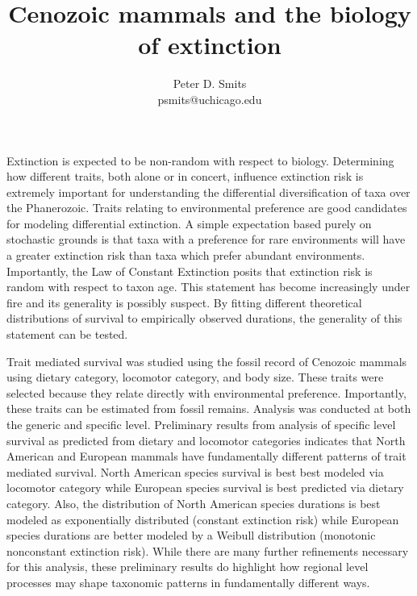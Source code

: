 \documentclass{article}
\title{Cenozoic mammals and the biology of extinction}
\author{Peter D. Smits\\ psmits@uchicago.edu}
\begin{document}
\maketitle

Extinction is expected to be non-random with respect to biology. Determining how different traits, both alone or in concert, influence extinction risk is extremely important for understanding the differential diversification of taxa over the Phanerozoic. Traits relating to environmental preference are good candidates for modeling differential extinction. A simple expectation based purely on stochastic grounds is that taxa with a preference for rare environments will have a greater extinction risk than taxa which prefer abundant environments. Importantly, the Law of Constant Extinction posits that extinction risk is random with respect to taxon age. This statement has become increasingly under fire and its generality is possibly suspect. By fitting different theoretical distributions of survival to empirically observed durations, the generality of this statement can be tested. 

Trait mediated survival was studied using the fossil record of Cenozoic mammals using dietary category, locomotor category, and body size. These traits were selected because they relate directly with environmental preference. Importantly, these traits can be estimated from fossil remains. Analysis was conducted at both the generic and specific level. Preliminary results from analysis of specific level survival as predicted from dietary and locomotor categories indicates that North American and European mammals have fundamentally different patterns of trait mediated survival. North American species survival is best best modeled via locomotor category while European species survival is best predicted via dietary category. Also, the distribution of North American species durations is best modeled as exponentially distributed (constant extinction risk) while European species durations are better modeled by a Weibull distribution (monotonic nonconstant extinction risk). While there are many further refinements necessary for this analysis, these preliminary results do highlight how regional level processes may shape taxonomic patterns in fundamentally different ways.  
\end{document}
